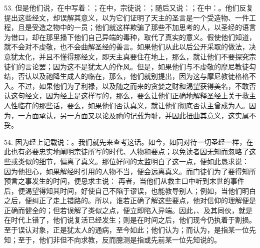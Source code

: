 53. 但是他们说，在中写着：；在中，宗徒说：；随后又说：；在中：。他们反复提出这些经文，却误解其意义，以为它们证明了天主的圣言是一个受造物、一件工程，且是受造之物中的一员；他们就这样欺骗了那些不加思考的人，以圣经的语言为借口，却在那里播下他们自己异端的毒种，取代了真实的意义。假使他们知道，就不会对不虔敬，也不会曲解圣经的善言。如果他们从此以后公开采取的做法，决意犹太化，并且不懂得那经文，即天主真要住在地上，那么，就让他们不要探究宗徒们的言论罢；因为这不是犹太人的作风。但是，如果他们与不虔敬的摩尼教徒勾结，否认以及祂降生成人的临在，那么，他们就别提出，因为这与摩尼教徒格格不入。不过，如果他们为了利禄，以及随之而来的贪婪之财和渴望获得美名，不敢否认这句经文，因为经上是这样写的，那么，要么让他们正确地解释圣经上关于救主人性临在的那些话，要么，如果他们否认真义，就让他们彻底否认主曾成为人。因为，一方面承认，另一方面又以论及祂的记载为耻，并因此扭曲其意义，这实属不妥。\par

54. 因为经上记载说：。我们就先来查考这话。如今，如同对待一切圣经一样，在此也有必要忠实地阐明宗徒所写的时代、人物和要点；以免读者因无知而忽略了这些或类似的细节，偏离了真义。那位好问的太监明白了这一点，便如此恳求说： 因为他担心，如果解经时引用的人物不当，便会远离真义。而门徒们为了要得知所预言之事发生的时间，便恳求主说： 再者，当他们从救主口中听到末世的事件后，便渴望得知其时间，好使自己不陷于谬误，也能教导别人；例如，当他们明白之后，便纠正了走上错路的。所以，谁若正确了解这些要点，他对信仰的理解便是正确而健全的；但若误解了类似之点，便立即陷入异端。因此，、及其同伙，就是在时代上错了，他们说复活已经发生；则是在时间之后，他们现今仍执着于割损。至于误认对象，正是犹太人的通病，至今如此；他们认为；而认为，是指某一位先知；至于，他们非但不向求教，反而臆测是指或先前某一位先知说的。\par

